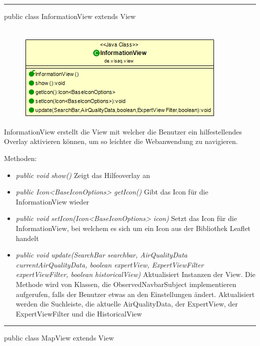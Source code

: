\rule{\textwidth}{0.4pt}
public class InformationView extends View
\\\\
\begin{minipage}{0.4\textwidth}
    \begin{figure}[H]
        \includegraphics[scale = 0.5]{media/frontend/view/de.view/InformationView_Class.png}
    \end{figure}
\end{minipage} \hfill
\begin{minipage}{0.5\textwidth}
    InformationView erstellt die View mit welcher die Benutzer ein hilfestellendes Overlay aktivieren können, um so leichter
    die Webanwendung zu navigieren.
\end{minipage}

Methoden:
\begin{itemize}
    \item \emph{public void show()} Zeigt das Hilfeoverlay an
    \item \emph{public Icon<BaseIconOptions> getIcon()} Gibt das Icon für die InformationView wieder
    \item \emph{public void setIcon(Icon<BaseIconOptions> icon)} Setzt das Icon für die InformationView, bei welchem es sich um ein Icon aus der Bibliothek \gls{Leaflet} handelt
    \item \emph{public void update(SearchBar searchbar, AirQualityData currentAirQualityData, boolean expertView, ExpertViewFilter expertViewFilter, boolean historicalView)} Aktualisiert Instanzen der View. Die Methode wird von Klassen, die ObservedNavbarSubject implementieren aufgerufen, falls der Benutzer etwas an den Einstellungen ändert. Aktualisiert werden die Suchleiste, die aktuelle AirQualityData, der ExpertView, der ExpertViewFilter und die HistoricalView
\end{itemize}

\rule{\textwidth}{0.4pt}
public class MapView extends View

